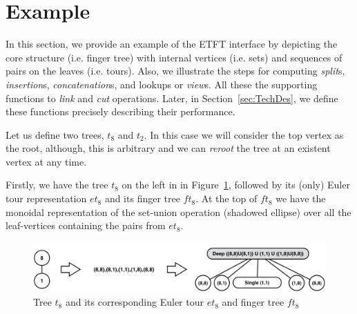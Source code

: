 \section{Example}
\label{sec:Example} 

In this section, we provide an example of the ETFT interface by depicting the core structure (i.e. finger tree) with internal vertices (i.e. sets) and sequences of pairs on the leaves (i.e. tours). Also, we illustrate the steps for computing \textit{split}s, \textit{insertion}s, \textit{concatenation}s, and lookups or \textit{view}s. All these the supporting functions to \textit{link} and \textit{cut} operations. Later, in Section~\ref{sec:TechDes}, we define these functions precisely describing their performance. 




Let us define two trees, $t_8$ and $t_2$. In this case we will consider the top vertex as the root, although, this is arbitrary and we can \textit{reroot} the tree at an existent vertex at any time.

Firstly, we have the tree $t_8$ on the left in in Figure~\ref{fig:t1et1ft1}, followed by its (only) Euler tour representation $et_8$ and its finger tree $ft_8$. At the top of $ft_8$ we have the monoidal representation of the set-union operation (shadowed ellipse) over all the leaf-vertices containing the pairs from $et_8$.
\begin{figure}
\begin{center}
\includegraphics[scale=0.35]{./Images/t1et1ft1} 
\end{center}
\caption{Tree $t_8$ and its corresponding Euler tour $et_8$ and finger tree $ft_8$}
\label{fig:t1et1ft1}
\end{figure}


